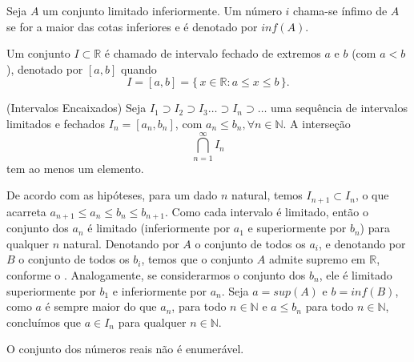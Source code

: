 \documentclass[../main.tex]{subfiles}
\begin{document}
\begin{defi}
    Seja $A$ um conjunto limitado inferiormente. Um número $i$ chama-se ínfimo de $A$ se for a maior das cotas inferiores e é denotado por $inf(A)$.
\end{defi}

\begin{defi}\label{enum-def-intervalos}
    Um conjunto $I \subset \mathbb{R}$ é chamado de intervalo fechado de extremos $a$ e $b$ (com $a<b$), denotado por $[a,b]$ quando 
    \[I = [a,b] = \{\,x \in \mathbb{R} : a \leq x \leq b \,\} .\]
\end{defi}

\begin{teo}{(Intervalos Encaixados)}\label{enum-teo-intervalosEncaixados}
    Seja $I_1 \supset I_2 \supset I_3 \dots \supset I_n \supset \dots$ uma sequência de intervalos limitados e fechados $I_n = [a_n, b_n]$, com $a_n \leq b_n, \forall n \in \mathbb{N}$.
    A interseção \[ \bigcap^\infty_{n=1} I_n \] tem ao menos um elemento.
\end{teo}
\begin{dem}
    De acordo com as hipóteses, para um dado $n$ natural, temos $I_{n+1} \subset I_n$, o que acarreta $a_{n+1} \leq a_n \leq b_n \leq b_{n+1}$. 
    Como cada intervalo é limitado, então o conjunto dos $a_n$ é limitado (inferiormente por $a_1$ e superiormente por $b_n$) para qualquer $n$ natural. Denotando por $A$ o conjunto de todos os $a_i$, e denotando por $B$ o conjunto de todos os $b_i$, temos que o conjunto $A$ admite supremo em $\mathbb{R}$, conforme o . Analogamente, se considerarmos o conjunto dos 
    $b_n$, ele é limitado superiormente por $b_1$ e inferiormente por $a_n$.
    Seja $a = sup(A)$ e $b = inf(B)$, como $a$ é sempre maior do que $a_n$, para todo $n \in \mathbb{N}$ e $a \leq b_n$ para todo $n \in \mathbb{N}$, concluímos que $a \in I_n$ para qualquer $n \in \mathbb{N}$.    
\end{dem}
\begin{teo}\label{enum-teo-RnaoEnumeravel}
    O conjunto dos números reais não é enumerável.
\end{teo}
\end{document}
